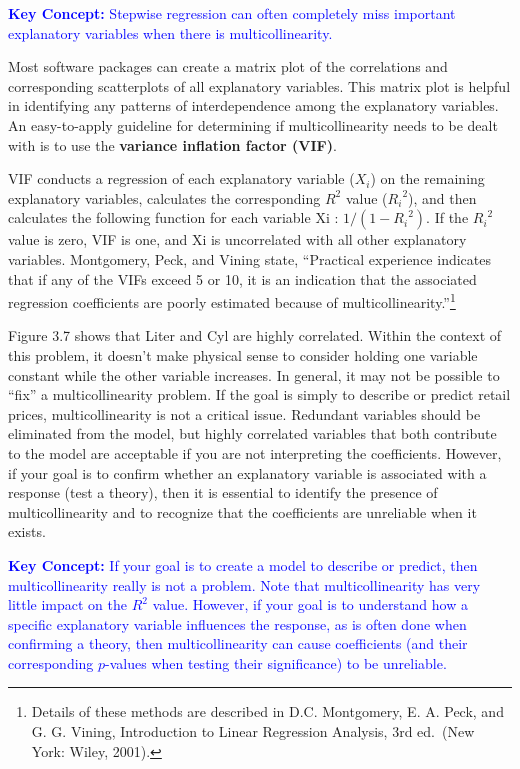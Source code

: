 \documentclass[
]{report}
\begin{document}
\textbf{\textcolor{blue}{Key Concept:}}
\textcolor{blue}{Stepwise regression can often completely miss important explanatory variables when there is multicollinearity.}

Most software packages can create a matrix plot of the correlations and corresponding scatterplots of all explanatory variables. This matrix plot is helpful in identifying any patterns of interdependence among the explanatory variables. An easy-to-apply guideline for determining if multicollinearity needs to be dealt with is to use the \textbf{variance inflation factor (VIF)}.

VIF conducts a regression of each explanatory variable (\(\scriptstyle X_i\)) on the remaining explanatory variables, calculates the corresponding \(\scriptstyle {R}^2\) value (\(\scriptstyle {R_i}^2\)), and then calculates the following function for each variable Xi : \(\scriptstyle 1/(1 - {R_i}^2)\). If the \(\scriptstyle {R_i}^2\) value is zero, VIF is one, and Xi is uncorrelated with all other explanatory variables. Montgomery, Peck, and Vining state, ``Practical experience indicates that if any of the VIFs exceed 5 or 10, it is an indication that the associated regression coefficients are poorly estimated because of multicollinearity.''\footnote{Details of these methods are described in D.C. Montgomery, E. A. Peck, and G. G. Vining, Introduction to Linear Regression Analysis, 3rd ed.~(New York: Wiley, 2001).}

Figure 3.7 shows that Liter and Cyl are highly correlated. Within the context of this problem, it doesn't make physical sense to consider holding one variable constant while the other variable increases. In general, it may not be possible to ``fix'' a multicollinearity problem. If the goal is simply to describe or predict retail prices, multicollinearity is not a critical issue. Redundant variables should be eliminated from the model, but highly correlated variables that both contribute to the model are acceptable if you are not interpreting the coefficients. However, if your goal is to confirm whether an explanatory variable is associated with a response (test a theory), then it is essential to identify the presence of multicollinearity and to recognize that the coefficients are unreliable when it exists.

\textbf{\textcolor{blue}{Key Concept:}}
\textcolor{blue}{If your goal is to create a model to describe or predict, then multicollinearity really is not a problem. Note that multicollinearity has very little impact on the $\scriptstyle {R}^2$ value. However, if your goal is to understand how a specific explanatory variable influences the response, as is often done when confirming a theory, then multicollinearity can cause coefficients (and their corresponding $\scriptstyle p$-values when testing their significance) to be unreliable.}
\end{document}
